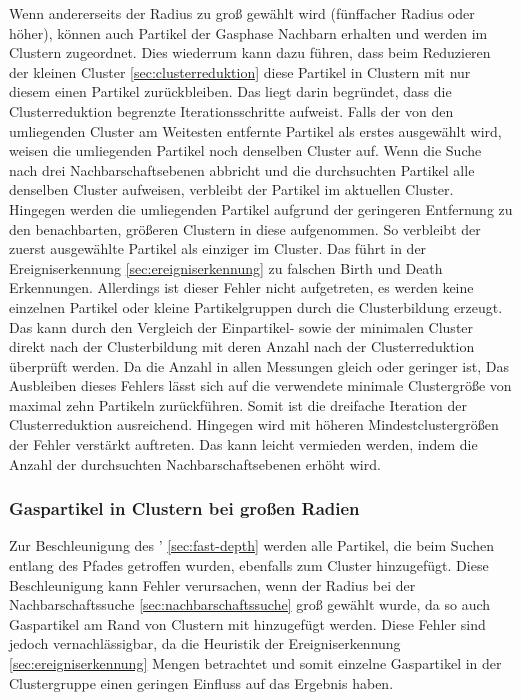 Wenn andererseits der Radius zu groß gewählt wird (fünffacher Radius oder höher), können auch Partikel der Gasphase Nachbarn erhalten und werden im \CFD Clustern zugeordnet. Dies wiederrum kann dazu führen, dass beim Reduzieren der kleinen Cluster \autoref{sec:clusterreduktion} diese Partikel in Clustern mit nur diesem einen Partikel zurückbleiben. Das liegt darin begründet, dass die Clusterreduktion begrenzte Iterationsschritte aufweist. Falls der von den umliegenden Cluster am Weitesten entfernte Partikel als erstes ausgewählt wird, weisen die umliegenden Partikel noch denselben Cluster auf. Wenn die Suche nach drei Nachbarschaftsebenen abbricht und die durchsuchten Partikel alle denselben Cluster aufweisen, verbleibt der Partikel im aktuellen Cluster. Hingegen werden die umliegenden Partikel aufgrund der geringeren Entfernung zu den benachbarten, größeren Clustern in diese aufgenommen. So verbleibt der zuerst ausgewählte Partikel als einziger im Cluster. Das führt in der Ereigniserkennung \autoref{sec:ereigniserkennung} zu falschen Birth und Death Erkennungen.
Allerdings ist dieser Fehler nicht aufgetreten, es werden keine einzelnen Partikel oder kleine Partikelgruppen durch die Clusterbildung erzeugt. %
Das kann durch den Vergleich der Einpartikel- sowie der minimalen Cluster direkt nach der Clusterbildung mit deren Anzahl nach der Clusterreduktion überprüft werden. Da die Anzahl in allen Messungen gleich oder geringer ist, %
Das Ausbleiben dieses Fehlers lässt sich auf die verwendete minimale Clustergröße von maximal zehn Partikeln zurückführen. Somit ist die dreifache Iteration der Clusterreduktion ausreichend. Hingegen wird mit höheren Mindestclustergrößen der Fehler verstärkt auftreten. Das kann leicht vermieden werden, indem die Anzahl der durchsuchten Nachbarschaftsebenen erhöht wird.

\subsubsection*{Gaspartikel in Clustern bei großen Radien}

Zur Beschleunigung des \CFD' \autoref{sec:fast-depth} werden alle Partikel, die beim Suchen entlang des Pfades getroffen wurden, ebenfalls zum Cluster hinzugefügt. Diese Beschleunigung kann Fehler verursachen, wenn der Radius bei der Nachbarschaftssuche \autoref{sec:nachbarschaftssuche} groß gewählt wurde, da so auch Gaspartikel am Rand von Clustern mit hinzugefügt werden. Diese Fehler sind jedoch vernachlässigbar, da die Heuristik der Ereigniserkennung \autoref{sec:ereigniserkennung} Mengen betrachtet und somit einzelne Gaspartikel in der Clustergruppe einen geringen Einfluss auf das Ergebnis haben.

